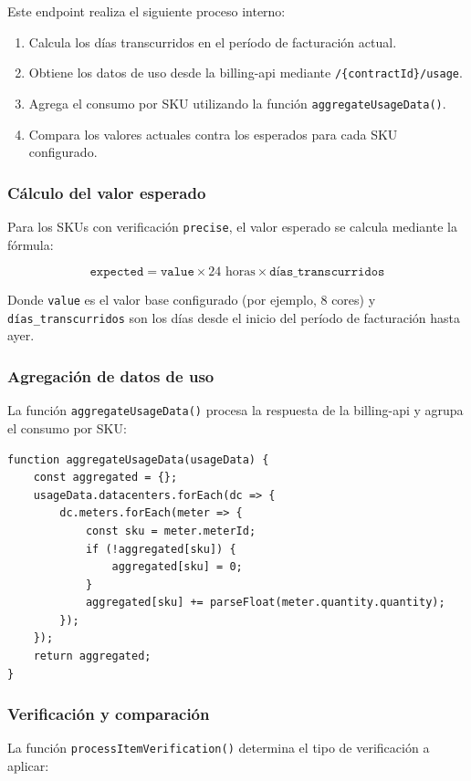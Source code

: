 Este endpoint realiza el siguiente proceso interno:
\begin{enumerate}
    \item Calcula los días transcurridos en el período de facturación actual.
    \item Obtiene los datos de uso desde la billing-api mediante \texttt{/\{contractId\}/usage}.
    \item Agrega el consumo por SKU utilizando la función \texttt{aggregateUsageData()}.
    \item Compara los valores actuales contra los esperados para cada SKU configurado.
\end{enumerate}

\subsubsection{Cálculo del valor esperado}
Para los SKUs con verificación \texttt{precise}, el valor esperado se calcula mediante la fórmula:

\begin{equation}
\texttt{expected} = \texttt{value} \times 24 \text{ horas} \times \texttt{días\_transcurridos}
\end{equation}

Donde \texttt{value} es el valor base configurado (por ejemplo, 8 cores) y \texttt{días\_transcurridos} son los días desde el inicio del período de facturación hasta ayer.

\subsubsection{Agregación de datos de uso}
La función \texttt{aggregateUsageData()} procesa la respuesta de la billing-api y agrupa el consumo por SKU:

\begin{lstlisting}[caption=Función de agregación de datos de uso, label=lst:aggregate-usage]
function aggregateUsageData(usageData) {
    const aggregated = {};
    usageData.datacenters.forEach(dc => {
        dc.meters.forEach(meter => {
            const sku = meter.meterId;
            if (!aggregated[sku]) {
                aggregated[sku] = 0;
            }
            aggregated[sku] += parseFloat(meter.quantity.quantity);
        });
    });
    return aggregated;
}
\end{lstlisting}

\subsubsection{Verificación y comparación}
La función \texttt{processItemVerification()} determina el tipo de verificación a aplicar:

